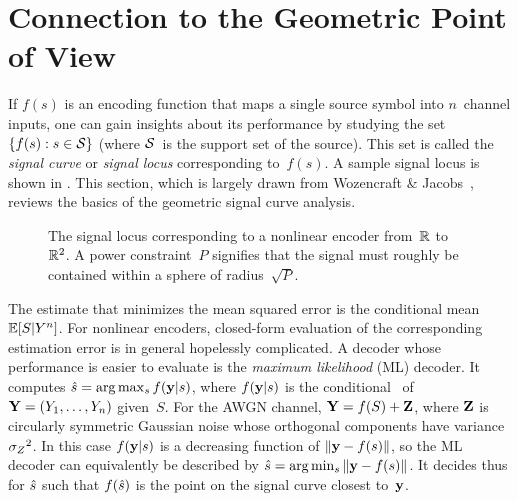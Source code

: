 \section{Connection to the Geometric Point of View}\label{sec:geomviewpoint}

If $f(s)$ is an encoding function that maps a single source symbol into
$n$~channel inputs, one can gain insights about its performance by studying the
set $\{f(s): s \in \mathcal{S}\}$ (where $\mathcal{S}$~is the support set of the source). This
set is called the \emph{signal curve} or \emph{signal locus} corresponding
to~$f(s)$. A sample signal locus is shown in . This section,
which is largely drawn from Wozencraft \& Jacobs~\cite{WozencraftJ1965}, reviews
the basics of the geometric signal curve analysis.

\begin{figure}
  \begin{center}
    
  \end{center}
  \caption{The signal locus corresponding to a nonlinear encoder from~$\mathbb{R}$
  to~$\mathbb{R}^2$. A power constraint~$P$ signifies that the signal must roughly be
  contained within a sphere of radius~$\sqrt{P}$.}
  \label{fig:nonlinlocus}
\end{figure}

The estimate that minimizes the mean squared error is the conditional mean $\mathbb{E}[S
| Y^n]$. For nonlinear encoders, closed-form evaluation of the corresponding
estimation error is in general hopelessly complicated. A decoder whose
performance is easier to evaluate is the \emph{maximum likelihood} (ML) decoder.
It computes ${\hat{s}} = \arg\max_{s} f(\mathbf{y}|s)$, where $f(\mathbf{y}|s)$ is the conditional
\pdf\ of~$\mathbf{Y} = (Y_1, \dots, Y_n)$ given~$S$. For the AWGN channel, $\mathbf{Y} = f(S) +
\mathbf{Z}$, where $\mathbf{Z}$ is circularly symmetric Gaussian noise whose orthogonal
components have variance~${{\sigma_Z}^2}$. In this case $f(\mathbf{y}|s)$ is a decreasing function
of $\|\mathbf{y} - f(s)\|$, so the ML decoder can equivalently be described by ${\hat{s}} =
\arg\min_{s} \|\mathbf{y} - f(s)\|$. It decides thus for ${\hat{s}}$ such that $f({\hat{s}})$ is the
point on the signal curve closest to~$\mathbf{y}$. 


